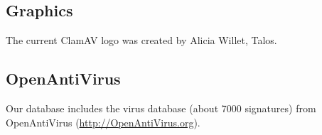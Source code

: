 \documentclass[a4paper,titlepage,12pt]{article}
\begin{document}
    \subsection{Graphics}
    The current ClamAV logo was created by Alicia Willet, Talos.

    \subsection{OpenAntiVirus}
    Our database includes the virus database (about 7000 signatures) from
    OpenAntiVirus (\url{http://OpenAntiVirus.org}).
\end{document}
